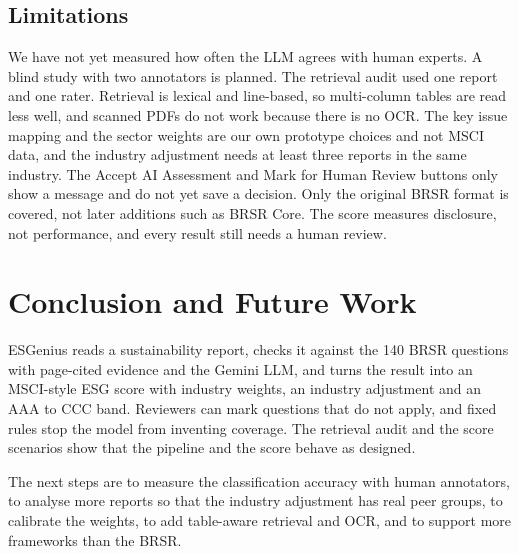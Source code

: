 \documentclass[conference]{IEEEtran}
\begin{document}
\subsection{Limitations}
We have not yet measured how often the LLM agrees with human experts. A blind study with two annotators is planned. The retrieval audit used one report and one rater. Retrieval is lexical and line-based, so multi-column tables are read less well, and scanned PDFs do not work because there is no OCR. The key issue mapping and the sector weights are our own prototype choices and not MSCI data, and the industry adjustment needs at least three reports in the same industry. The Accept AI Assessment and Mark for Human Review buttons only show a message and do not yet save a decision. Only the original BRSR format is covered, not later additions such as BRSR Core. The score measures disclosure, not performance, and every result still needs a human review.

\section{Conclusion and Future Work}
ESGenius reads a sustainability report, checks it against the 140 BRSR questions with page-cited evidence and the Gemini LLM, and turns the result into an MSCI-style ESG score with industry weights, an industry adjustment and an AAA to CCC band. Reviewers can mark questions that do not apply, and fixed rules stop the model from inventing coverage. The retrieval audit and the score scenarios show that the pipeline and the score behave as designed.

The next steps are to measure the classification accuracy with human annotators, to analyse more reports so that the industry adjustment has real peer groups, to calibrate the weights, to add table-aware retrieval and OCR, and to support more frameworks than the BRSR.
\end{document}
